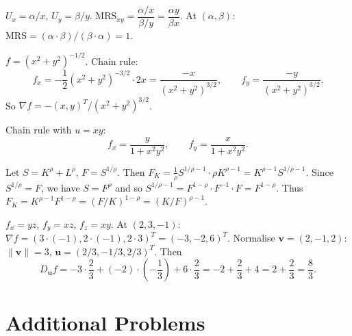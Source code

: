 \begin{solutions}
  \item $U_x=\alpha/x$, $U_y=\beta/y$.
        $\mathrm{MRS}_{xy}=\dfrac{\alpha/x}{\beta/y}=\dfrac{\alpha y}{\beta x}$.
        At $(\alpha,\beta)$: $\mathrm{MRS}=(\alpha\cdot\beta)/(\beta\cdot\alpha)=1$.

  \item $f=(x^2+y^2)^{-1/2}$. Chain rule:
        \[
          f_x=-\frac12(x^2+y^2)^{-3/2}\cdot2x=\frac{-x}{(x^2+y^2)^{3/2}},
          \qquad f_y=\frac{-y}{(x^2+y^2)^{3/2}} .
        \]
        So $\nabla f=-(x,y)^T/(x^2+y^2)^{3/2}$.

  \item Chain rule with $u=xy$:
        \[
          f_x=\frac{y}{1+x^2y^2}, \qquad f_y=\frac{x}{1+x^2y^2} .
        \]

  \item Let $S=K^\rho+L^\rho$, $F=S^{1/\rho}$. Then
        $F_K=\frac1\rho S^{1/\rho-1}\cdot\rho K^{\rho-1}
        =K^{\rho-1}S^{1/\rho-1}$. Since $S^{1/\rho}=F$, we have $S=F^\rho$
        and so $S^{1/\rho-1}=F^{1-\rho}\cdot F^{-1}\cdot F=F^{1-\rho}$.
        Thus $F_K=K^{\rho-1}F^{1-\rho}=(F/K)^{1-\rho}=(K/F)^{\rho-1}$.
        \checkmark

  \item $f_x=yz$, $f_y=xz$, $f_z=xy$. At $(2,3,-1)$:
        $\nabla f=(3\cdot(-1),2\cdot(-1),2\cdot3)^T=(-3,-2,6)^T$.
        Normalise $\mathbf{v}=(2,-1,2)$: $\|\mathbf{v}\|=3$,
        $\mathbf{u}=(2/3,-1/3,2/3)^T$. Then
        \[
          D_{\mathbf{u}}f=-3\cdot\frac23+(-2)\cdot\left(-\frac13\right)
            +6\cdot\frac23=-2+\frac23+4=2+\frac23=\frac83 .
        \]
\end{solutions}

\section{Additional Problems}

